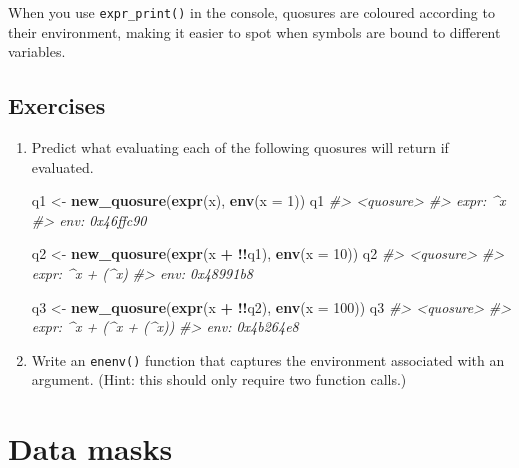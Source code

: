 \documentclass[]{book}
\newenvironment{Shaded}{\begin{snugshade}}{\end{snugshade}}
\newcommand{\CommentTok}[1]{\textcolor[rgb]{0.37,0.37,0.37}{\textit{#1}}}
\newcommand{\DataTypeTok}[1]{\textcolor[rgb]{0.27,0.27,0.27}{#1}}
\newcommand{\DecValTok}[1]{\textcolor[rgb]{0.06,0.06,0.06}{#1}}
\newcommand{\KeywordTok}[1]{\textcolor[rgb]{0.27,0.27,0.27}{\textbf{#1}}}
\newcommand{\NormalTok}[1]{#1}
\newcommand{\OperatorTok}[1]{\textcolor[rgb]{0.43,0.43,0.43}{\textbf{#1}}}
\newcommand{\StringTok}[1]{\textcolor[rgb]{0.5,0.5,0.5}{#1}}
\begin{document}
When you use \texttt{expr\_print()} in the console, quosures are coloured according to their environment, making it easier to spot when symbols are bound to different variables.

\hypertarget{exercises-10}{%
\subsection{Exercises}\label{exercises-10}}

\begin{enumerate}
\def\labelenumi{\arabic{enumi}.}
\item
  Predict what evaluating each of the following quosures will return if
  evaluated.

\begin{Shaded}
\begin{Highlighting}[]
\NormalTok{q1 <-}\StringTok{ }\KeywordTok{new_quosure}\NormalTok{(}\KeywordTok{expr}\NormalTok{(x), }\KeywordTok{env}\NormalTok{(}\DataTypeTok{x =} \DecValTok{1}\NormalTok{))}
\NormalTok{q1}
\CommentTok{#> <quosure>}
\CommentTok{#> expr: ^x}
\CommentTok{#> env:  0x46ffc90}

\NormalTok{q2 <-}\StringTok{ }\KeywordTok{new_quosure}\NormalTok{(}\KeywordTok{expr}\NormalTok{(x }\OperatorTok{+}\StringTok{ }\OperatorTok{!!}\NormalTok{q1), }\KeywordTok{env}\NormalTok{(}\DataTypeTok{x =} \DecValTok{10}\NormalTok{))}
\NormalTok{q2}
\CommentTok{#> <quosure>}
\CommentTok{#> expr: ^x + (^x)}
\CommentTok{#> env:  0x48991b8}

\NormalTok{q3 <-}\StringTok{ }\KeywordTok{new_quosure}\NormalTok{(}\KeywordTok{expr}\NormalTok{(x }\OperatorTok{+}\StringTok{ }\OperatorTok{!!}\NormalTok{q2), }\KeywordTok{env}\NormalTok{(}\DataTypeTok{x =} \DecValTok{100}\NormalTok{))}
\NormalTok{q3}
\CommentTok{#> <quosure>}
\CommentTok{#> expr: ^x + (^x + (^x))}
\CommentTok{#> env:  0x4b264e8}
\end{Highlighting}
\end{Shaded}
\item
  Write an \texttt{enenv()} function that captures the environment associated
  with an argument. (Hint: this should only require two function calls.)
\end{enumerate}

\hypertarget{data-masks}{%
\section{Data masks}\label{data-masks}}

\end{document}
